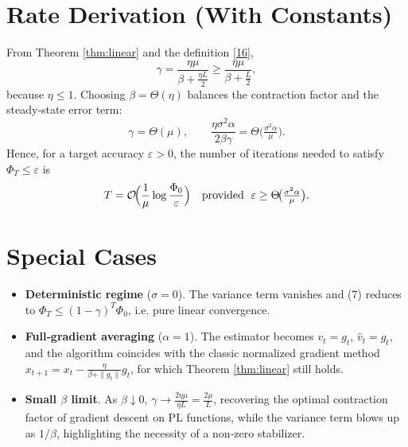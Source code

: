 \documentclass{article}
\begin{document}
\section*{Rate Derivation (With Constants)}
From Theorem \ref{thm:linear} and the definition \eqref{16},
\[
    \gamma = \frac{\eta\mu}{\beta+\frac{\eta L}{2}}
           \ge \frac{\eta\mu}{\beta+\frac{L}{2}} ,
\]
because $\eta\le 1$. Choosing $\beta = \Theta(\eta)$ balances the contraction factor and the steady‑state error term:
\[
    \gamma = \Theta(\mu), \qquad
    \frac{\eta\sigma^2\alpha}{2\beta\gamma}= \Theta\!\bigl(\tfrac{\sigma^2\alpha}{\mu}\bigr).
\]
Hence, for a target accuracy $\varepsilon>0$, the number of iterations needed to satisfy $\Phi_T\le \varepsilon$ is
\[
    T = \mathcal{O}\!\Bigl(\frac{1}{\mu}\log\frac{\Phi_0}{\varepsilon}\Bigr)
    \quad\text{provided }\;
    \varepsilon \ge \Theta\!\bigl(\tfrac{\sigma^2\alpha}{\mu}\bigr).
\]

\section*{Special Cases}
\begin{itemize}[leftmargin=*]
\item \textbf{Deterministic regime} ($\sigma=0$). The variance term vanishes and (7) reduces to $\Phi_T\le (1-\gamma)^T\Phi_0$, i.e. pure linear convergence.
\item \textbf{Full‑gradient averaging} ($\alpha=1$). The estimator becomes $v_t=g_t$, $\hat v_t=g_t$, and the algorithm coincides with the classic normalized gradient method $x_{t+1}=x_t-\frac{\eta}{\beta+\|g_t\|}g_t$, for which Theorem \ref{thm:linear} still holds.
\item \textbf{Small $\beta$ limit}. As $\beta\downarrow 0$, $\gamma\to \frac{2\eta\mu}{\eta L}= \frac{2\mu}{L}$, recovering the optimal contraction factor of gradient descent on PL functions, while the variance term blows up as $1/\beta$, highlighting the necessity of a non‑zero stabilizer.
\end{itemize}
\end{document}
